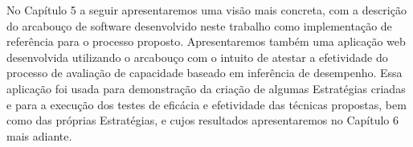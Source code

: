 No Capítulo 5 a seguir apresentaremos uma visão mais concreta, com a descrição do 
arcabouço de software desenvolvido neste trabalho como implementação de referência
para o processo proposto. Apresentaremos também uma aplicação
web desenvolvida utilizando o arcabouço com o intuito de atestar a efetividade do processo de avaliação 
de capacidade baseado em inferência de desempenho. Essa aplicação foi usada para
demonstração da criação de algumas Estratégias criadas e para a execução dos 
testes de eficácia e efetividade das técnicas propostas, bem como das próprias
Estratégias, e cujos resultados apresentaremos no Capítulo 6 mais adiante.
   
